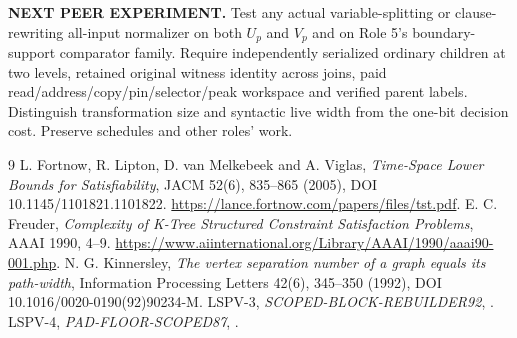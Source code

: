 \documentclass[11pt]{article}
\begin{document}
\textbf{NEXT PEER EXPERIMENT.} Test any actual variable-splitting or clause-rewriting all-input normalizer on both $U_p$ and $V_p$ and on Role 5's boundary-support comparator family. Require independently serialized ordinary children at two levels, retained original witness identity across joins, paid read/address/copy/pin/selector/peak workspace and verified parent labels. Distinguish transformation size and syntactic live width from the one-bit decision cost. Preserve schedules and other roles' work.

\begin{thebibliography}{9}
 L. Fortnow, R. Lipton, D. van Melkebeek and A. Viglas, \emph{Time-Space Lower Bounds for Satisfiability}, JACM 52(6), 835--865 (2005), DOI 10.1145/1101821.1101822. \url{https://lance.fortnow.com/papers/files/tst.pdf}.
 E. C. Freuder, \emph{Complexity of K-Tree Structured Constraint Satisfaction Problems}, AAAI 1990, 4--9. \url{https://www.aiinternational.org/Library/AAAI/1990/aaai90-001.php}.
 N. G. Kinnersley, \emph{The vertex separation number of a graph equals its path-width}, Information Processing Letters 42(6), 345--350 (1992), DOI 10.1016/0020-0190(92)90234-M.
 LSPV-3, \emph{SCOPED-BLOCK-REBUILDER92}, .
 LSPV-4, \emph{PAD-FLOOR-SCOPED87}, .
\end{thebibliography}
\end{document}

